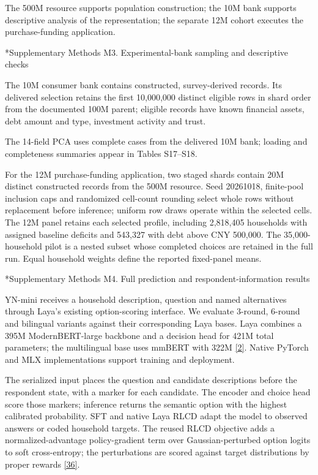 \documentclass[10pt]{article}
\makeatletter
\renewcommand\section{\@startsection{section}{1}{\z@}{-2.2ex plus -1ex minus -.2ex}{.9ex plus .2ex}{\normalfont\large\mdseries}}
\makeatother
\begin{document}
The 500M resource supports population construction; the 10M bank supports descriptive analysis of the representation; the separate 12M cohort executes the purchase-funding application.


\section*{Supplementary Methods M3. Experimental-bank sampling and descriptive checks}

The 10M consumer bank contains constructed, survey-derived records. Its delivered selection retains the first 10,000,000 distinct eligible rows in shard order from the documented 100M parent; eligible records have known financial assets, debt amount and type, investment activity and trust.

The 14-field PCA uses complete cases from the delivered 10M bank; loading and completeness summaries appear in Tables S17--S18.


For the 12M purchase-funding application, two staged shards contain 20M distinct constructed records from the 500M resource. Seed 20261018, finite-pool inclusion caps and randomized cell-count rounding select whole rows without replacement before inference; uniform row draws operate within the selected cells. The 12M panel retains each selected profile, including 2,818,405 households with assigned baseline deficits and 543,327 with debt above CNY 500,000. The 35,000-household pilot is a nested subset whose completed choices are retained in the full run. Equal household weights define the reported fixed-panel means.

\section*{Supplementary Methods M4. Full prediction and respondent-information results}

YN-mini receives a household description, question and named alternatives through Laya’s existing option-scoring interface. We evaluate 3-round, 6-round and bilingual variants against their corresponding Laya bases. Laya combines a 395M ModernBERT-large backbone and a decision head for 421M total parameters; the multilingual base uses mmBERT with 322M \href{https://github.com/LeonaDavinci/laya-system-one}{[2]}. Native PyTorch and MLX implementations support training and deployment.

The serialized input places the question and candidate descriptions before the respondent state, with a marker for each candidate. The encoder and choice head score those markers; inference returns the semantic option with the highest calibrated probability. SFT and native Laya RLCD adapt the model to observed answers or coded household targets. The reused RLCD objective adds a normalized-advantage policy-gradient term over Gaussian-perturbed option logits to soft cross-entropy; the perturbations are scored against target distributions by proper rewards \href{https://github.com/NandhaKishorM/laya/blob/main/laya/train.py}{[36]}.
\end{document}
